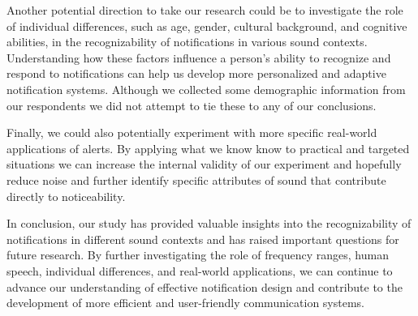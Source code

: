 \documentclass[manuscript,screen,review]{acmart}
\begin{document}
Another potential direction to take our research could be to investigate the role of individual differences, such as age, gender, cultural background, and cognitive abilities, in the recognizability of notifications in various sound contexts. Understanding how these factors influence a person's ability to recognize and respond to notifications can help us develop more personalized and adaptive notification systems. Although we collected some demographic information from our respondents we did not attempt to tie these to any of our conclusions.

Finally, we could also potentially experiment with more specific real-world applications of alerts. By applying what we know know to practical and targeted situations we can increase the internal validity of our experiment and hopefully reduce noise and further identify specific attributes of sound that contribute directly to noticeability.

In conclusion, our study has provided valuable insights into the recognizability of notifications in different sound contexts and has raised important questions for future research. By further investigating the role of frequency ranges, human speech, individual differences, and real-world applications, we can continue to advance our understanding of effective notification design and contribute to the development of more efficient and user-friendly communication systems.





\appendix
\end{document}
